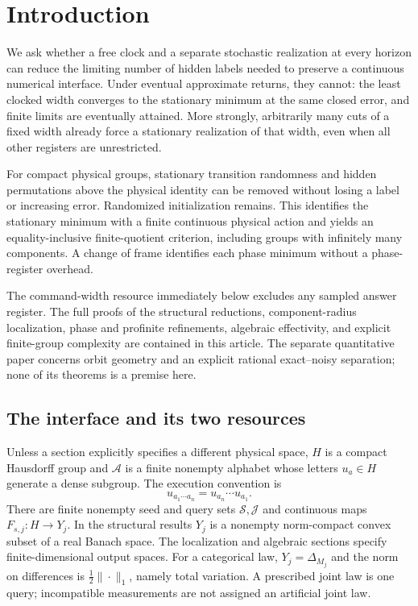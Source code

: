 \section{Introduction}
We ask whether a free clock and a separate stochastic realization at
every horizon can reduce the limiting number of hidden labels needed to
preserve a continuous numerical interface. Under eventual approximate
returns, they cannot: the least clocked width converges to the stationary
minimum at the same closed error, and finite limits are eventually
attained. More strongly, arbitrarily many cuts of a fixed width already
force a stationary realization of that width, even when all other
registers are unrestricted.

For compact physical groups, stationary transition randomness and hidden
permutations above the physical identity can be removed without losing
a label or increasing error. Randomized initialization remains. This
identifies the stationary minimum with a finite continuous physical
action and yields an equality-inclusive finite-quotient criterion,
including groups with infinitely many components. A change of frame
identifies each phase minimum without a phase-register overhead.

The command-width resource immediately below excludes any sampled answer
register. The full proofs of the structural reductions, component-radius
localization, phase and profinite refinements, algebraic effectivity, and
explicit finite-group complexity are contained in this article. The
separate quantitative paper concerns orbit geometry and an explicit
rational exact--noisy separation; none of its theorems is a premise here.
\subsection{The interface and its two resources}
Unless a section explicitly specifies a different physical space, $H$ is a compact Hausdorff group and $\mathcal A$ is a finite nonempty alphabet whose letters $u_a\in H$ generate a dense subgroup. The execution convention is
\[
                  u_{a_1\cdots a_n}=u_{a_n}\cdots u_{a_1}.
\]
There are finite nonempty seed and query sets $\mathcal S,\mathcal J$ and continuous maps $F_{s,j}:H\to Y_j$. In the structural results $Y_j$ is a nonempty norm-compact convex subset of a real Banach space. The localization and algebraic sections specify finite-dimensional output spaces. For a categorical law, $Y_j=\Delta_{M_j}$ and the norm on differences is $\frac12\|\cdot\|_1$, namely total variation. A prescribed joint law is one query; incompatible measurements are not assigned an artificial joint law.

